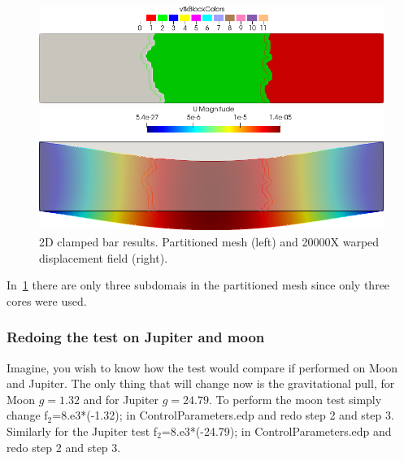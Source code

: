 \documentclass{report}
\begin{document}
\begin{figure}[htbp]
    \centering
    \begin{minipage}[t][2cm][t]{0.4\textwidth}
    \includegraphics[align=t,width=1\textwidth]{2d-bar-partitioned3.png}
    \end{minipage}\hspace{.1\textwidth}
    \begin{minipage}[t][2cm][t]{0.4\textwidth}
    \includegraphics[align=t,width=1\textwidth]{2d-bar-clamped-ends.png}
    \end{minipage}
    \caption{2D clamped bar results. Partitioned mesh (left) and 20000X warped displacement field (right).}
    \label{fig:3part}
\end{figure}

In~\cref{fig:3part} there are only three subdomais in the partitioned mesh since only three cores were used.

\subsubsection{Redoing the test on Jupiter and moon}

Imagine, you wish to know how the test would compare if performed on Moon and Jupiter. The only thing that will change now is the gravitational pull, for Moon $g=1.32$ and for Jupiter $g=24.79$. To perform the moon test simply change  {\ttfamily f$_2$=8.e3*(-1.32);} in {\ttfamily ControlParameters.edp} and redo step 2 and step 3. Similarly for the Jupiter test {\ttfamily f$_2$=8.e3*(-24.79);} in {\ttfamily ControlParameters.edp} and redo step 2 and step 3.
\end{document}
